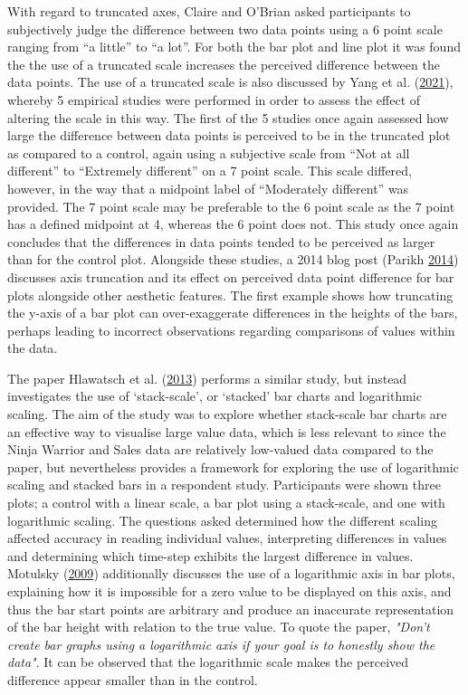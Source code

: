\documentclass[
  11pt,
]{book}
\begin{document}
With regard to truncated axes, Claire and O'Brian asked participants to
subjectively judge the difference between two data points using a 6
point scale ranging from ``a little'' to ``a lot''. For both the bar
plot and line plot it was found the the use of a truncated scale
increases the perceived difference between the data points. The use of a
truncated scale is also discussed by Yang et al.
(\protect\hyperlink{ref-YANG2021}{2021}), whereby 5 empirical studies
were performed in order to assess the effect of altering the scale in
this way. The first of the 5 studies once again assessed how large the
difference between data points is perceived to be in the truncated plot
as compared to a control, again using a subjective scale from ``Not at
all different'' to ``Extremely different'' on a 7 point scale. This
scale differed, however, in the way that a midpoint label of
``Moderately different'' was provided. The 7 point scale may be
preferable to the 6 point scale as the 7 point has a defined midpoint at
4, whereas the 6 point does not. This study once again concludes that
the differences in data points tended to be perceived as larger than for
the control plot. Alongside these studies, a 2014 blog post (Parikh
\protect\hyperlink{ref-parikh_2014}{2014}) discusses axis truncation and
its effect on perceived data point difference for bar plots alongside
other aesthetic features. The first example shows how truncating the
y-axis of a bar plot can over-exaggerate differences in the heights of
the bars, perhaps leading to incorrect observations regarding
comparisons of values within the data.

The paper Hlawatsch et al. (\protect\hyperlink{ref-stackscale}{2013})
performs a similar study, but instead investigates the use of
`stack-scale', or `stacked' bar charts and logarithmic scaling. The aim
of the study was to explore whether stack-scale bar charts are an
effective way to visualise large value data, which is less relevant to
since the Ninja Warrior and Sales data are relatively low-valued data
compared to the paper, but nevertheless provides a framework for
exploring the use of logarithmic scaling and stacked bars in a
respondent study. Participants were shown three plots; a control with a
linear scale, a bar plot using a stack-scale, and one with logarithmic
scaling. The questions asked determined how the different scaling
affected accuracy in reading individual values, interpreting differences
in values and determining which time-step exhibits the largest
difference in values. Motulsky (\protect\hyperlink{ref-logax}{2009})
additionally discusses the use of a logarithmic axis in bar plots,
explaining how it is impossible for a zero value to be displayed on this
axis, and thus the bar start points are arbitrary and produce an
inaccurate representation of the bar height with relation to the true
value. To quote the paper,
\textit{"Don’t create bar graphs using a logarithmic axis if your goal is to honestly show the data"}.
It can be observed that the logarithmic scale makes the perceived
difference appear smaller than in the control.
\end{document}
